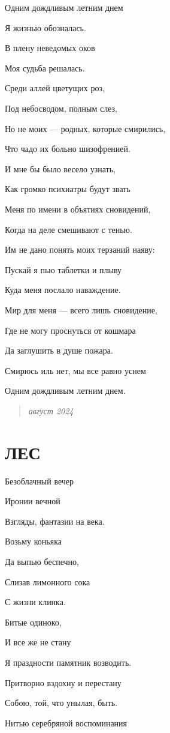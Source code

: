 \documentclass[
  a5paperpaper,
  DIV=11,
  numbers=noendperiod]{scrreprt}
\begin{document}
Одним дождливым летним днем

Я жизнью обозналась.

В плену неведомых оков

Моя судьба решалась.

Среди аллей цветущих роз,

Под небосводом, полным слез,

Но не моих --- родных, которые смирились,

Что чадо их больно шизофренией.

И мне бы было весело узнать,

Как громко психиатры будут звать

Меня по имени в объятиях сновидений,

Когда на деле смешивают с тенью.

Им не дано понять моих терзаний наяву:

Пускай я пью таблетки и плыву

Куда меня послало наваждение.

Мир для меня --- всего лишь сновидение,

Где не могу проснуться от кошмара

Да заглушить в душе пожара.

Смирюсь иль нет, мы все равно уснем

Одним дождливым летним днем.

\begin{quote}
\emph{август 2024}
\end{quote}

\section{ЛЕС}\label{ux43bux435ux441}

Безоблачный вечер

Иронии вечной

Взгляды, фантазии на века.

Возьму коньяка

Да выпью беспечно,

Слизав лимонного сока

С жизни клинка.

Битые одиноко,

И все же не стану

Я праздности памятник возводить.

Притворно вздохну и перестану

Собою, той, что унылая, быть.

Нитью серебряной воспоминания
\end{document}
